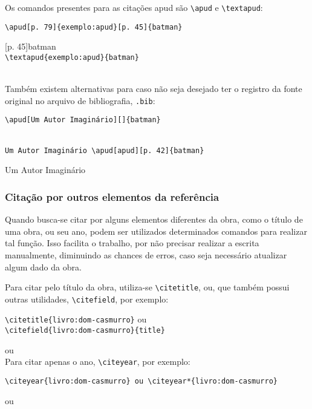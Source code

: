 Os comandos presentes para as citações apud são \verb|\apud| e \verb|\textapud|:

\verb|\apud[p. 79]{exemplo:apud}[p. 45]{batman}|

[p. 45]{batman}\\

\verb|\textapud{exemplo:apud}{batman}|

\\

Também existem alternativas para caso não seja desejado ter o registro da fonte original no arquivo de bibliografia, \texttt{.bib}:

\verb|\apud[Um Autor Imaginário][]{batman}|

\\

\verb|Um Autor Imaginário \apud[apud][p. 42]{batman}|

Um Autor Imaginário 

\subsubsection{Citação por outros elementos da referência}
Quando busca-se citar por alguns elementos diferentes da obra, como o título de uma obra, ou seu ano, podem ser utilizados determinados comandos para realizar tal função\footnotemark. Isso facilita o trabalho, por não precisar realizar a escrita manualmente, diminuindo as chances de erros, caso seja necessário atualizar algum dado da obra.

Para citar pelo título da obra, utiliza-se \verb|\citetitle|, ou, que também possui outras utilidades, \verb|\citefield|, por exemplo: 

\verb|\citetitle{livro:dom-casmurro}| ou \\\verb|\citefield{livro:dom-casmurro}{title}|

 ou \\

Para citar apenas o ano, \verb|\citeyear|, por exemplo: 

\verb|\citeyear{livro:dom-casmurro} ou \citeyear*{livro:dom-casmurro}|

\citeyear{livro:dom-casmurro} ou \citeyear*{livro:dom-casmurro}\\

